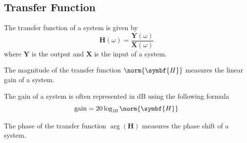 \documentclass{article}
\begin{document}
\subsection{Transfer Function}
\begin{definition}
    The transfer function of a system is given by
    \begin{equation*}
        \symbf{H}(\omega) = \frac{\symbf{Y}(\omega)}{\symbf{X}(\omega)}
    \end{equation*}
    where \(\symbf{Y}\) is the output and \(\symbf{X}\) is the input of a system.
\end{definition}
\begin{definition}
    The magnitude of the transfer function \(\norm{\symbf{H}}\) measures the linear gain of a system.
\end{definition}
\begin{definition}
    The gain of a system is often represented in \unit{dB} using the following formula
    \begin{equation*}
        \mathrm{gain} = 20 \log_{10}{\norm{\symbf{H}}}
    \end{equation*}
\end{definition}
\begin{definition}
    The phase of the transfer function \(\arg{\left( \symbf{H} \right)}\) measures the phase shift of a system.
\end{definition}
\end{document}
